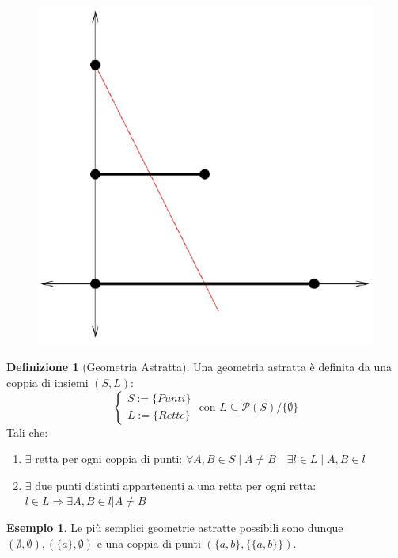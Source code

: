 \documentclass[a4paper,10pt]{article}
\theoremstyle{definition}
\theoremstyle{indentdefinition}
\newtheorem{defn}{Definizione}[section]
\theoremstyle{indentpostulate}
\theoremstyle{indenttheorem}
\theoremstyle{myremark}
\newtheorem{example*}{Esempio}
\theoremstyle{indentgeneral}
\begin{document}
\begin{figure}[H]
    \centering
    \includegraphics[scale=0.3]{Bisezione.png}
\end{figure}

\vspace{.5cm}

\begin{defn}[Geometria Astratta]
    Una geometria astratta è definita da una coppia di insiemi $(S,L):$ $$\begin{cases}
        S:=\{ Punti \} \\
        L:=\{ Rette \}
    \end{cases} \text{ con } L \subseteq \mathscr{P}(S)/ \{ \emptyset \}$$
Tali che:
\begin{enumerate}
    \item $\exists$ retta per ogni coppia di punti: $\forall A,B \in S \mid A \neq B \quad \exists l \in L\mid A,B \in l$
    \item $\exists$ due punti distinti appartenenti a una retta per ogni retta: $l \in L \Rightarrow \exists A,B \in l|A \neq B$
\end{enumerate}
\end{defn}


\begin{example*}
    Le più semplici geometrie astratte possibili sono dunque $(\emptyset , \emptyset), (\{ a \}, \emptyset)$ e una coppia di punti $( \{ a,b  \} , \{ \{ a,b \} \} )$.
\end{example*}
\end{document}
